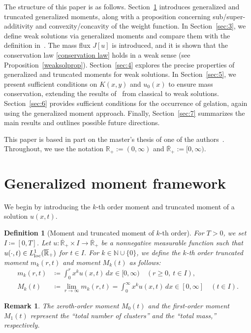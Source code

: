 \documentclass[a4paper,11pt]{article}
\newtheorem{dfn}[thm]{Definition}
\newtheorem{rem}[thm]{Remark}
\def\N{{\mathbb N}}
\def\Rp{{\mathbb R}_+}
\def\Rb{\overline{{\mathbb R}}_+}
\begin{document}
The structure of this paper is as follows. Section~\ref{sec:2} introduces generalized and truncated generalized moments, along with a proposition concerning sub/super-additivity and convexity/concavity of the weight function. In Section~\ref{sec:3}, we define weak solutions via generalized moments and compare them with the definition in~\cite{E-L-M-P2003}. The mass flux $J[u]$ is introduced, and it is shown that the conservation law \eqref{conservation law} holds in a weak sense (see Proposition~\ref{weaksolprop}). Section~\ref{sec:4} explores the precise properties of generalized and truncated moments for weak solutions. In Section~\ref{sec:5}, we present sufficient conditions on $K(x,y)$ and $u_0(x)$ to ensure mass conservation, extending the results of~\cite{I-K-M2023} from classical to weak solutions. Section~\ref{sec:6} provides sufficient conditions for the occurrence of gelation, again using the generalized moment approach. Finally, Section~\ref{sec:7} summarizes the main results and outlines possible future directions.

This paper is based in part on the master's thesis of one of the authors~\cite{Miyata2025}. Throughout, we use the notation $\Rp := (0, \infty)$ and $\Rb := [0, \infty)$.

\section{Generalized moment framework}\label{sec:2}
\setcounter{equation}{0}

We begin by introducing the $k$-th order moment and truncated moment of a solution $u(x,t)$.

\begin{dfn}[Moment and truncated moment of $k$-th order]\label{moment}
  For $T>0$, we set $I\coloneqq[0,T]$.
  Let $u:\Rb\times I\to \Rb$ be a nonnegative measurable function such that
  $u(\cdot,t)\in L^1_{\rm loc}(\Rb)$ for $t\in I$.
  For $k\in \N\cup \{0\}$, we define the $k$-th order truncated moment $m_k(r,t)$ and moment
  $M_k(t)$ as follows:
  \begin{align*}
    m_k(r,t)&\coloneqq \int^r_0 x^k u(x,t)\,dx \in [0,\infty) \quad(r\geq 0,\ t\in I),\\
    M_k(t)&\coloneqq \lim_{r\to \infty} m_k(r,t) = \int^\infty_0 x^k u(x,t)\,dx \in [0,\infty] \quad(t\in I).
  \end{align*}
\end{dfn}

\begin{rem}
{\rm
  The zeroth-order moment $M_0(t)$ and the first-order moment $M_1(t)$ represent the ``total number of clusters'' and the ``total mass,'' respectively.
}
\end{rem}
\end{document}
